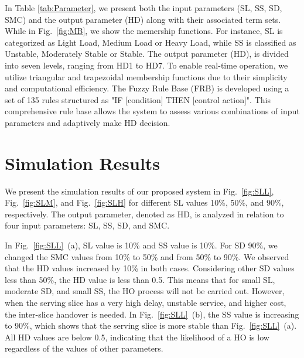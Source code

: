 \documentclass[graybox]{svmult}
\begin{document}
In Table \ref{tab:Parameter}, we present both the input parameters (SL, SS, SD, SMC) and the output parameter (HD) along with their associated term sets. While in Fig.~\ref{fig:MB}, we show the memership functions. For instance, SL is categorized as Light Load, Medium Load or Heavy Load, while SS is classified as Unstable, Moderately Stable or Stable. The output parameter (HD), is divided into seven levels, ranging from HD1 to HD7. To enable real-time operation, we utilize triangular and trapezoidal membership functions due to their simplicity and computational efficiency. The Fuzzy Rule Base (FRB) is developed using a set of 135 rules structured as "IF [condition] THEN [control action]". This comprehensive rule base allows the system to assess various combinations of input parameters and adaptively make HD decision.

 
\section{Simulation Results}\label{sec:sim-results}
We present the simulation results of our proposed system in Fig.~\ref{fig:SLL}, Fig.~\ref{fig:SLM}, and Fig.~\ref{fig:SLH} for different SL values 10\%, 50\%, and 90\%, respectively. The output parameter, denoted as HD, is analyzed in relation to four input parameters: SL, SS, SD, and SMC. 

 
In Fig.~\ref{fig:SLL}~(a), SL value is 10\% and SS value is 10\%. For SD 90\%, we changed the SMC values from 10\% to 50\% and from 50\% to 90\%. We observed that the HD values increased by 10\% in both cases. Considering other SD values less than 50\%, the HD value is less than 0.5. This means that for small SL, moderate SD, and small SS, the HO process will not be carried out. However, when the serving slice has a very high delay, unstable service, and higher cost, the inter-slice handover is needed. In Fig.~\ref{fig:SLL}~(b), the SS value is increasing to 90\%, which shows that the serving slice is more stable than Fig.~\ref{fig:SLL}~(a). All HD values are below 0.5, indicating that the likelihood of a HO is low regardless of the values of other parameters.
\end{document}
